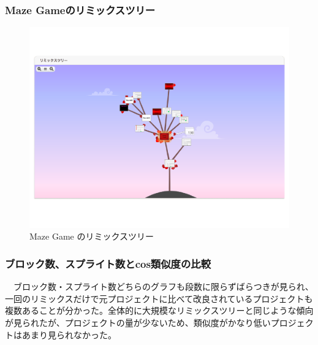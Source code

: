 \documentclass[a4paper,10pt,onecolumn,oneside,openany]{jsbook}
\begin{document}
\subsubsection{Maze Gameのリミックスツリー}
\begin{figure}[ht]
  \centering
    \includegraphics[scale=0.5]{mazegameremix.pdf}
  \caption{Maze Game のリミックスツリー}
  \label{mgrt}
 \end{figure}
\subsubsection{ブロック数、スプライト数とcos類似度の比較}
　ブロック数・スプライト数どちらのグラフも段数に限らずばらつきが見られ、一回のリミックスだけで元プロジェクトに比べて改良されているプロジェクトも複数あることが分かった。全体的に大規模なリミックスツリーと同じような傾向が見られたが、プロジェクトの量が少ないため、類似度がかなり低いプロジェクトはあまり見られなかった。
\end{document}
